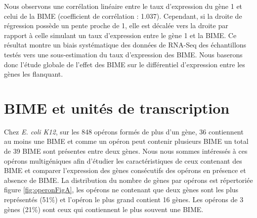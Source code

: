 \documentclass[12pt,a4paper]{report}
\begin{document}
\begin{onehalfspace}
Nous observons une corrélation linéaire entre le taux d'expression du gène 1 et celui de la BIME (coefficient de corrélation : 1.037). Cependant, si la droite de régression possède un pente proche de 1, elle est décalée vers la droite par rapport à celle simulant un taux d'expression entre le gène 1 et la BIME. Ce résultat montre un biais systématique des données de RNA-Seq des échantillons testés vers une sous-estimation du taux d'expression des BIME. Nous baserons donc l'étude globale de l'effet des BIME sur le différentiel d'expression entre les gènes les flanquant.

\section*{BIME et unités de transcription}

Chez \textit{E. coli K12}, sur les 848 opérons formés de plus d'un gène, 36 contiennent au moins une BIME et comme un opéron peut contenir plusieurs BIME un total de 39 BIME sont présentes entre deux gènes. Nous nous sommes intéressés à ces opérons multigéniques afin d'étudier les caractéristiques de ceux contenant des BIME et comparer l'expression des gènes consécutifs des opérons en présence et absence de BIME. La distribution du nombre de gènes par opérons est répertoriée figure \autoref{fig:operonFigA}, les opérons ne contenant que deux gènes sont les plus représentés (51\%) et l'opéron le plus grand contient 16 gènes. Les opérons de 3 gènes (21\%) sont ceux qui contiennent le plus souvent une BIME.


\end{onehalfspace}
\end{document}
